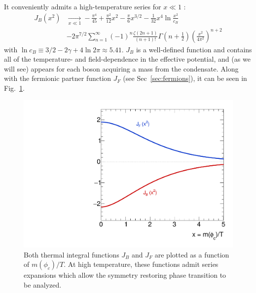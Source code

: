 \documentclass[%
 reprint,
nofootinbib,
 amsmath,amssymb,
 aps,
floatfix,
]{revtex4-1}
\newcommand\underrel[2]{\mathrel{\mathop{#2}\limits_{#1}}}
\begin{document}
It conveniently admits a high-temperature series for $x\ll 1$ \cite{quiros99}:
\begin{equation}
\begin{split}
    J_B(x^2) &\underrel{x\ll 1}{\rightarrow} -\frac{\pi^4}{45} +\frac{\pi^2}{12} x^2 - \frac{\pi}{6} x^{3/2} - \frac{1}{32} x^4\ln \frac{x^2}{c_B} \\
    &- 2\pi^{7/2} \sum_{n=1}^\infty (-1)^n \frac{\zeta(2n+1)}{(n+1)!}\Gamma\left(n+\frac{1}{2}\right)\left(\frac{x^2}{4\pi^2}\right)^{n+2}
\end{split}
\end{equation}
with $\ln c_B \equiv 3/2-2\gamma + 4\ln 2\pi \approx 5.41$.
$J_B$ is a well-defined function and contains all of the temperature- and field-dependence in the effective potential, and (as we will see) appears for each boson acquiring a mass from the condensate.
Along with the fermionic partner function $J_F$ (see Sec~\ref{sec:fermions}), it can be seen in Fig.~\ref{fig:thermalfuncs}.
\begin{figure}
    \centering
    \includegraphics[width=\linewidth]{thermalfuncs.pdf}
    \caption{Both thermal integral functions $J_B$ and $J_F$ are plotted as a function of $m(\phi_c)/T$. At high temperature, these functions admit series expansions which allow the symmetry restoring phase transition to be analyzed.}
    \label{fig:thermalfuncs}
\end{figure}
\end{document}
